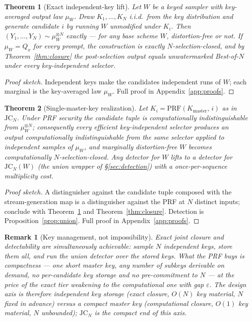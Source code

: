 \documentclass{article} %
\newtheorem{theorem}{Theorem}
\newtheorem{remark}{Remark}
\begin{document}
\begin{theorem}[Exact independent-key lift]\label{thm:exactlift}
Let $W$ be a keyed sampler with key-averaged output law $\mu_W$. Draw
$K_1,\dots,K_N$ i.i.d.\ from the key distribution and generate candidate $i$
by running $W$ unmodified under $K_i$. Then
$(Y_1,\dots,Y_N)\sim\mu_W^{\otimes N}$ \emph{exactly} --- for any base
scheme $W$, distortion-free or not. If $\mu_W=Q_x$ for every prompt, the
construction is exactly $N$-selection-closed, and by
Theorem~\ref{thm:closure} the post-selection output equals unwatermarked
Best-of-$N$ under every key-independent selector.
\end{theorem}
\begin{proof}[Proof sketch]
Independent keys make the candidates independent runs of $W$; each marginal is
the key-averaged law $\mu_W$. Full proof in Appendix~\ref{app:proofs}.
\end{proof}

\begin{theorem}[Single-master-key realization]\label{thm:lifting}
Let $K_i=\mathrm{PRF}(K_{\mathrm{master}},\,i)$ as in $\mathrm{JC}_N$. Under
PRF security the candidate tuple is computationally indistinguishable from
$\mu_W^{\otimes N}$; consequently every \emph{efficient} key-independent
selector produces an output computationally indistinguishable from the same
selector applied to independent samples of $\mu_W$, and marginally
distortion-free $W$ becomes \emph{computationally} $N$-selection-closed. Any
detector for $W$ lifts to a detector for $\mathrm{JC}_N(W)$ (the union
wrapper of \S\ref{sec:detection}) with a once-per-sequence multiplicity cost.
\end{theorem}
\begin{proof}[Proof sketch]
A distinguisher against the candidate tuple composed with the
stream-generation map is a distinguisher against the PRF at $N$ distinct
inputs; conclude with Theorem~\ref{thm:exactlift} and
Theorem~\ref{thm:closure}. Detection is Proposition~\ref{prop:union}. Full
proof in Appendix~\ref{app:proofs}.
\end{proof}

\begin{remark}[Key management, not impossibility]\label{rem:price}
Exact joint closure and detectability are simultaneously achievable: sample
$N$ independent keys, store them all, and run the union detector over the
stored keys. What the PRF buys is \emph{compactness} --- one short master key,
any number of subkeys derivable on demand, no per-candidate key storage and no
pre-commitment to $N$ --- at the price of the exact tier weakening to the
computational one with gap $\varepsilon$. The design axis is therefore
\emph{independent key storage} (exact closure, $O(N)$ key material, $N$ fixed
in advance) versus a \emph{compact master key} (computational closure, $O(1)$
key material, $N$ unbounded); $\mathrm{JC}_N$ is the compact end of this
axis.
\end{remark}
\end{document}
